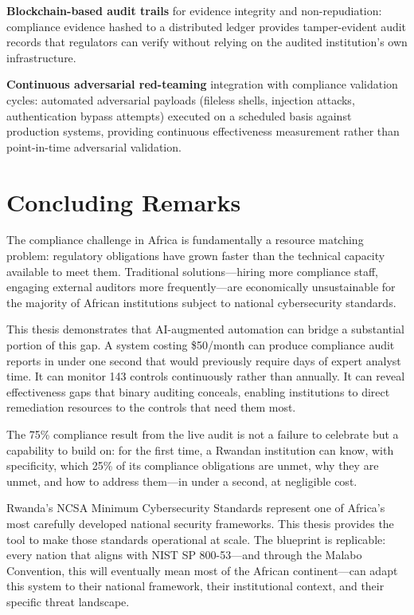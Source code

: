 \documentclass[12pt,oneside]{report}
\begin{document}
\textbf{Blockchain-based audit trails} for evidence integrity and non-repudiation: compliance evidence hashed to a distributed ledger provides tamper-evident audit records that regulators can verify without relying on the audited institution's own infrastructure.

\textbf{Continuous adversarial red-teaming} integration with compliance validation cycles: automated adversarial payloads (fileless shells, injection attacks, authentication bypass attempts) executed on a scheduled basis against production systems, providing continuous effectiveness measurement rather than point-in-time adversarial validation.

\section{Concluding Remarks}

The compliance challenge in Africa is fundamentally a resource matching problem: regulatory obligations have grown faster than the technical capacity available to meet them. Traditional solutions—hiring more compliance staff, engaging external auditors more frequently—are economically unsustainable for the majority of African institutions subject to national cybersecurity standards.

This thesis demonstrates that AI-augmented automation can bridge a substantial portion of this gap. A system costing \$50/month can produce compliance audit reports in under one second that would previously require days of expert analyst time. It can monitor 143 controls continuously rather than annually. It can reveal effectiveness gaps that binary auditing conceals, enabling institutions to direct remediation resources to the controls that need them most.

The 75\% compliance result from the live audit is not a failure to celebrate but a capability to build on: for the first time, a Rwandan institution can know, with specificity, which 25\% of its compliance obligations are unmet, why they are unmet, and how to address them—in under a second, at negligible cost.

Rwanda's NCSA Minimum Cybersecurity Standards represent one of Africa's most carefully developed national security frameworks. This thesis provides the tool to make those standards operational at scale. The blueprint is replicable: every nation that aligns with NIST SP 800-53—and through the Malabo Convention, this will eventually mean most of the African continent—can adapt this system to their national framework, their institutional context, and their specific threat landscape.
\end{document}
